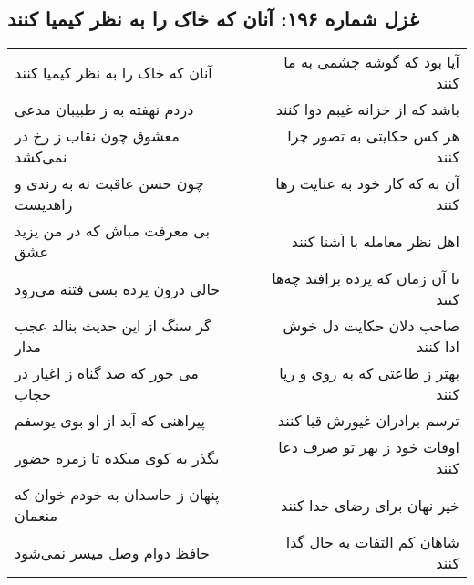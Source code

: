 \begin{center}
\section*{غزل شماره ۱۹۶: آنان که خاک را به نظر کیمیا کنند}
\label{sec:sh196}
\begin{longtable}{l p{0.5cm} r}
آنان که خاک را به نظر کیمیا کنند
&&
آیا بود که گوشه چشمی به ما کنند
\\
دردم نهفته به ز طبیبان مدعی
&&
باشد که از خزانه غیبم دوا کنند
\\
معشوق چون نقاب ز رخ در نمی‌کشد
&&
هر کس حکایتی به تصور چرا کنند
\\
چون حسن عاقبت نه به رندی و زاهدیست
&&
آن به که کار خود به عنایت رها کنند
\\
بی معرفت مباش که در من یزید عشق
&&
اهل نظر معامله با آشنا کنند
\\
حالی درون پرده بسی فتنه می‌رود
&&
تا آن زمان که پرده برافتد چه‌ها کنند
\\
گر سنگ از این حدیث بنالد عجب مدار
&&
صاحب دلان حکایت دل خوش ادا کنند
\\
می خور که صد گناه ز اغیار در حجاب
&&
بهتر ز طاعتی که به روی و ریا کنند
\\
پیراهنی که آید از او بوی یوسفم
&&
ترسم برادران غیورش قبا کنند
\\
بگذر به کوی میکده تا زمره حضور
&&
اوقات خود ز بهر تو صرف دعا کنند
\\
پنهان ز حاسدان به خودم خوان که منعمان
&&
خیر نهان برای رضای خدا کنند
\\
حافظ دوام وصل میسر نمی‌شود
&&
شاهان کم التفات به حال گدا کنند
\\
\end{longtable}
\end{center}
